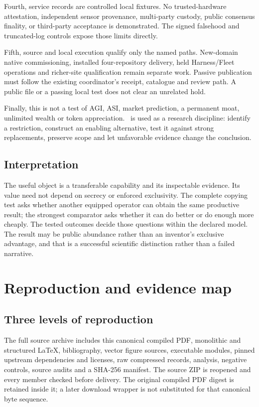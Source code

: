 Fourth, service records are controlled local fixtures. No trusted-hardware attestation, independent sensor provenance, multi-party custody, public consensus finality, or third-party acceptance is demonstrated. The signed falsehood and truncated-log controls expose those limits directly.

Fifth, source and local execution qualify only the named paths. New-domain native commissioning, installed four-repository delivery, held Harness/Fleet operations and richer-site qualification remain separate work. Passive publication must follow the existing coordinator's receipt, catalogue and review path. A public file or a passing local test does not clear an unrelated hold.

Finally, this is not a test of AGI, ASI, market prediction, a permanent moat, unlimited wealth or token appreciation. \TI\ is used as a research discipline: identify a restriction, construct an enabling alternative, test it against strong replacements, preserve scope and let unfavorable evidence change the conclusion.

\subsection{Interpretation}
The useful object is a transferable capability and its inspectable evidence. Its value need not depend on secrecy or enforced exclusivity. The complete copying test asks whether another equipped operator can obtain the same productive result; the strongest comparator asks whether it can do better or do enough more cheaply. The tested outcomes decide those questions within the declared model. The result may be public abundance rather than an inventor's exclusive advantage, and that is a successful scientific distinction rather than a failed narrative.


\clearpage
\appendix
\section{Reproduction and evidence map}
\subsection{Three levels of reproduction}
The full source archive includes this canonical compiled PDF, monolithic and structured LaTeX, bibliography, vector figure sources, executable modules, pinned upstream dependencies and licenses, raw compressed records, analysis, negative controls, source audits and a SHA-256 manifest. The source ZIP is reopened and every member checked before delivery. The original compiled PDF digest is retained inside it; a later download wrapper is not substituted for that canonical byte sequence.

